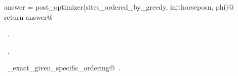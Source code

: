 \documentclass[11.5pt]{report}
\begin{document}
\begin{flushleft}
\begin{list}{}{}
\mbox{}\verb@      answer = post_optimizer(sites_ordered_by_greedy, inithorseposn, phi)@\\
\mbox{}\verb@      return answer@\\
\mbox{}\verb@@{\NWsep}
\end{list}
\vspace{-1.5ex}
\footnotesize
\begin{list}{}{\setlength{\itemsep}{-\parsep}\setlength{\itemindent}{-\leftmargin}}
\item \NWtxtMacroDefBy\ .
\item \NWtxtMacroRefIn\ .
\item \NWtxtIdentsUsed\nobreak\  \verb@algo_exact_given_specific_ordering@\nobreak\ .
\item{}
\end{list}
\vspace{4ex}
\end{flushleft}
\newchunk 
\end{document}
